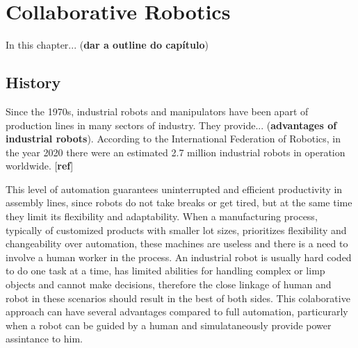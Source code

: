 \chapter{Collaborative Robotics}


\par In this chapter... (\textbf{dar a outline do capítulo})

\section{History}

\par Since the 1970s, industrial robots and manipulators have been apart of production lines in many sectors of industry. They provide... (\textbf{advantages of industrial robots}). 
According to the International Federation of Robotics, in the year 2020 there were an estimated 2.7 million industrial robots in operation worldwide. [\textbf{ref}]

\par This level of automation guarantees uninterrupted and efficient productivity in assembly lines, since robots do not take breaks or get tired, but at the same time they limit its flexibility and adaptability. When a manufacturing process, typically of customized products with smaller lot sizes, prioritizes flexibility and changeability over automation, these machines are useless and there is a need to involve a human worker in the process.
% 
An industrial robot is usually hard coded to do one task at a time, has limited abilities for handling complex or limp objects and cannot make decisions, therefore the close linkage of human and robot in these scenarios should result in the best of both sides. This colaborative approach can have several advantages compared to full automation, particurarly when a robot can be guided by a human and simulataneously provide power assintance to him.


